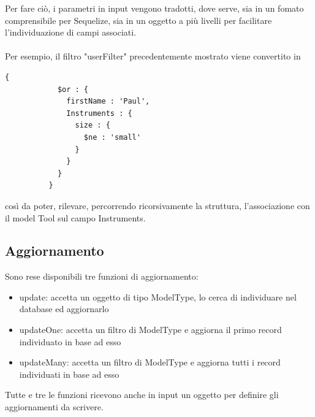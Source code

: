 \documentclass[a4paper, 12pt]{report}
\begin{document}
        Per fare ciò, i parametri in input vengono tradotti, dove serve, sia in un fomato comprensibile per Sequelize, sia in un oggetto a più livelli per facilitare l'individuazione di campi associati.
        \paragraph*{}
        Per esempio, il filtro "userFilter" precedentemente mostrato viene convertito in
        \begin{Verbatim}[samepage=true]
          {
            $or : {
              firstName : 'Paul',
              Instruments : {
                size : {
                  $ne : 'small'
                }
              }
            }
          }
        \end{Verbatim}
        così da poter, rilevare, percorrendo ricorsivamente la struttura, l'associazione con il model Tool sul campo Instruments.

    \newpage
    \subsection{Aggiornamento}
      Sono rese disponibili tre funzioni di aggiornamento: 
      \begin{itemize}
        \item update: accetta un oggetto di tipo ModelType, lo cerca di individuare nel database ed aggiornarlo
        \item updateOne: accetta un filtro di ModelType e aggiorna il primo record individuato in base ad esso
        \item updateMany: accetta un filtro di ModelType e aggiorna tutti i record individuati in base ad esso
      \end{itemize} 
      Tutte e tre le funzioni ricevono anche in input un oggetto per definire gli aggiornamenti da scrivere.
\end{document}
